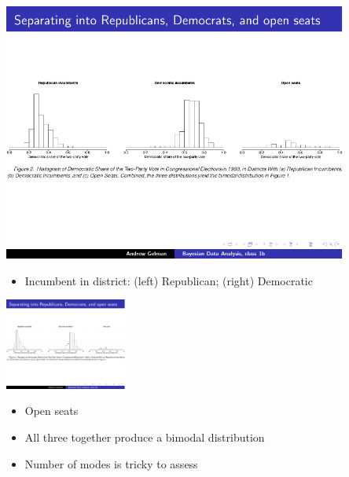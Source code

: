 \documentclass[10pt]{report}
\begin{document}
\begin{center}
\includegraphics[width=0.85\textwidth]{img/bimodal-rep-dem.pdf}
\end{center}
\begin{itemize}
\item Incumbent in district: (left) Republican; (right) Democratic
\end{itemize}

\begin{center}
\includegraphics[width=0.3\textwidth]{img/bimodal-indy.pdf}
\end{center}
\begin{itemize}
\item Open seats
\item All three together produce a bimodal distribution
\item Number of modes is tricky to assess
\end{itemize}
\end{document}
